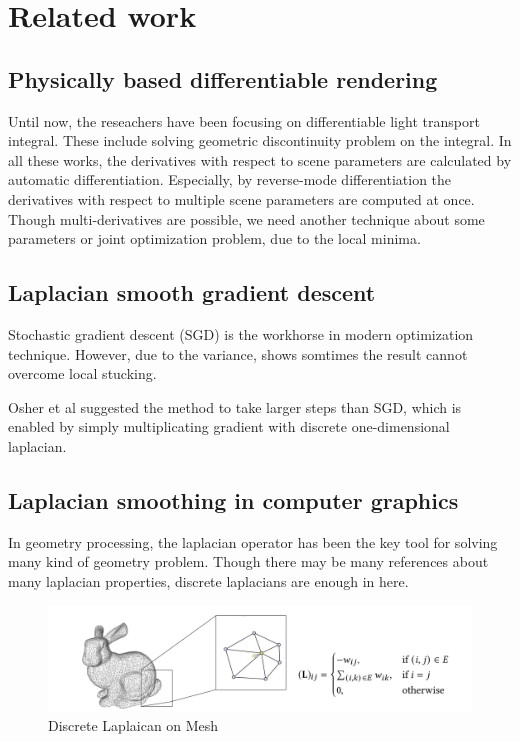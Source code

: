 \section*{Related work}\label{ch:ch2label}

\subsection*{Physically based differentiable rendering}

Until now, the reseachers have been focusing on differentiable light transport integral.
These include solving geometric discontinuity problem on the integral\cite{li2018differentiable, loubet2019reparameterizing, zhang2020path}. In all these works, the derivatives with respect to scene parameters are calculated by automatic differentiation. Especially, by reverse-mode differentiation the derivatives with respect to multiple scene parameters are computed at once. Though multi-derivatives are possible, we need another technique about some parameters or joint optimization problem, due to the local minima.

\subsection*{Laplacian smooth gradient descent}

Stochastic gradient descent (SGD) is the workhorse in modern optimization technique. However, due to the variance, shows somtimes the result cannot overcome local stucking. 

Osher et al\cite{osher2018laplacian} suggested the method to take larger steps than SGD, which is enabled by simply multiplicating gradient with discrete one-dimensional laplacian.

\subsection*{Laplacian smoothing in computer graphics}

In geometry processing, the laplacian operator has been the key tool for solving many kind of geometry problem. Though there may be many references about many laplacian properties, discrete laplacians are enough in here.

\begin{figure}
    \includegraphics[width=\textwidth]{figures/related-work-1.png}
    \caption{Discrete Laplaican on Mesh}
    \label{fig:discretelaplacian}
\end{figure}

